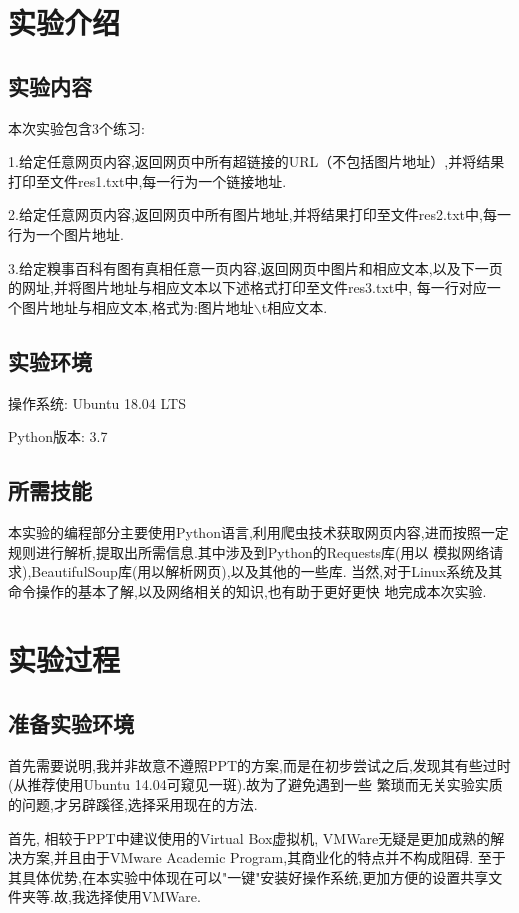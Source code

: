\documentclass[a4paper]{article}
\begin{document}
    \tableofcontents
    \newpage
    \section{实验介绍}
        \subsection{实验内容}
本次实验包含3个练习:

1.给定任意网页内容,返回网页中所有超链接的URL（不包括图片地址）,并将结果打印至文件res1.txt中,每一行为一个链接地址.

2.给定任意网页内容,返回网页中所有图片地址,并将结果打印至文件res2.txt中,每一行为一个图片地址.

3.给定糗事百科有图有真相任意一页内容,返回网页中图片和相应文本,以及下一页的网址,并将图片地址与相应文本以下述格式打印至文件res3.txt中,
每一行对应一个图片地址与相应文本,格式为:图片地址$\backslash$t相应文本.
        \subsection{实验环境}
操作系统: Ubuntu 18.04 LTS

Python版本: 3.7
        \subsection{所需技能}
本实验的编程部分主要使用Python语言,利用爬虫技术获取网页内容,进而按照一定规则进行解析,提取出所需信息.其中涉及到Python的Requests库(用以
模拟网络请求),BeautifulSoup库(用以解析网页),以及其他的一些库. 当然,对于Linux系统及其命令操作的基本了解,以及网络相关的知识,也有助于更好更快
地完成本次实验.
    \newpage
    \section{实验过程}
        \subsection{准备实验环境}
首先需要说明,我并非故意不遵照PPT的方案,而是在初步尝试之后,发现其有些过时(从推荐使用Ubuntu 14.04可窥见一斑).故为了避免遇到一些
繁琐而无关实验实质的问题,才另辟蹊径,选择采用现在的方法.

首先, 相较于PPT中建议使用的Virtual Box虚拟机, VMWare无疑是更加成熟的解决方案,并且由于VMware Academic Program,其商业化的特点并不构成阻碍.
至于其具体优势,在本实验中体现在可以"一键"安装好操作系统,更加方便的设置共享文件夹等.故,我选择使用VMWare.
\end{document}
